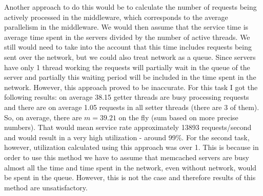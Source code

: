 \documentclass[11pt]{article}
\begin{document}
Another approach to do this would be to calculate the number of requests being actively processed in the middleware, which corresponds to the average parallelism in the middleware. We would then assume that the service time is average time spent in the servers divided by the number of active threads. We still would need to take into the account that this time includes requests being sent over the network, but we could also treat network as a queue. Since servers have only 1 thread working the requests will partially wait in the queue of the server and partially this waiting period will be included in the time spent in the network. However, this approach proved to be inaccurate. For this task I got the following results: on average 38.15 getter threads are busy processing requests and there are on average 1.05 requests in all setter threads (there are 3 of them). So, on average, there are $m = 39.21$ on the fly (sum based on more precise numbers). That would mean service rate approximately 13893 requests/second and would result in a very high utilization - around 99\%. For the second task, however, utilization calculated using this approach was over 1. This is because in order to use this method we have to assume that memcached servers are busy almost all the time and time spent in the network, even without network, would be spent in the queue. However, this is not the case and therefore results of this method are unsatisfactory. 


\end{document}
